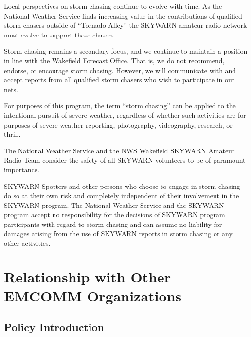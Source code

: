 \documentclass[pdflatex,letterpaper,twoside,12pt]{book}
\begin{document}
Local perspectives on storm chasing continue to evolve with time.  As the National Weather Service finds increasing value in the contributions of qualified storm chasers outside of ``Tornado Alley'' the SKYWARN amateur radio network must evolve to support those chasers.

Storm chasing remains a secondary focus, and we continue to maintain a position in line with the Wakefield Forecast Office.  That is, we do not recommend, endorse, or encourage storm chasing.  However, we will communicate with and accept reports from all qualified storm chasers who wish to participate in our nets.

For purposes of this program, the term ``storm chasing'' can be applied to the intentional pursuit of severe weather, regardless of whether such activities are for purposes of severe weather reporting, photography, videography, research, or thrill.

The National Weather Service and the NWS Wakefield SKYWARN Amateur Radio Team consider the safety of all SKYWARN volunteers to be of paramount importance.

SKYWARN Spotters and other persons who choose to engage in storm chasing do so at their own risk and completely independent of their involvement in the SKYWARN program.  The National Weather Service and the SKYWARN program accept no responsibility for the decisions of SKYWARN program participants with regard to storm chasing and can assume no liability for damages arising from the use of SKYWARN reports in storm chasing or any other activities.


\chapter{Relationship with Other EMCOMM Organizations}

\newcommand{\tpteam}{Third Party EMCOMM Team\ }

\newcommand{\tpteams}{Third Party EMCOMM Teams\ }

\section{Policy Introduction}
\end{document}
